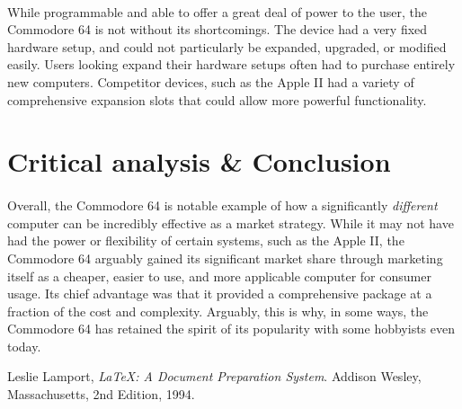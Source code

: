 \documentclass{article}
\begin{document}
\paragraph{}
While programmable and able to offer a great deal of power to the user, the Commodore 64 is not without its shortcomings. The device had a very fixed hardware setup, and could not particularly be expanded, upgraded, or modified easily. Users looking expand their hardware setups often had to purchase entirely new computers. Competitor devices, such as the Apple II had a variety of comprehensive expansion slots that could allow more powerful functionality. 

\section{Critical analysis \& Conclusion}
\paragraph{}
Overall, the Commodore 64 is notable example of how a significantly \textit{different} computer can be incredibly effective as a market strategy. While it may not have had the power or flexibility of certain systems, such as the Apple II, the Commodore 64 arguably gained its significant market share through marketing itself as a cheaper, easier to use, and more applicable computer for consumer usage. Its chief advantage was that it provided a comprehensive package at a fraction of the cost and complexity. Arguably, this is why, in some ways, the Commodore 64 has retained the spirit of its popularity with some hobbyists even today.

\pagebreak

\begin{thebibliography}{9}

  Leslie Lamport,
  \emph{\LaTeX: A Document Preparation System}.
  Addison Wesley, Massachusetts,
  2nd Edition,
  1994.

\end{thebibliography}
\end{document}
